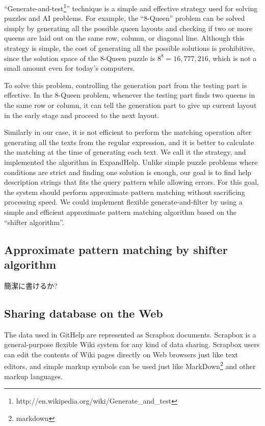 \documentclass{sigchi}
\def\GH{\textsf{GitHelp}}
\def\SB{\textsf{Scrapbox}}
\def\EH{\textsf{ExpandHelp}}
\begin{document}
``Generate-and-test\footnote{
  {\sf http:{\slash}{\slash}en.wikipedia.org{\slash}wiki{\slash}Generate\_and\_test}
}''
technique is a simple and effective strategy
used for solving puzzles and AI problems.
For example,
the ``8-Queen'' problem can be solved simply by
generating all the possible queen layouts and checking if
two or more queens are laid out on the same row, column, or diagonal line.
Although this strategy is simple, the cost of
generating all the possible solutions is prohibitive, since
the solution space of the 8-Queen puzzle is $8^8 = 16,777,216$,
which is not a small amount even for today's computers.

To solve this problem,
controlling the generation part from the testing part is effective.
In the 8-Queen problem,
whenever the testing part finds two queens in the same row or column,
it can tell the generation part to
give up current layout in the early stage and proceed to the next layout.

Similarly in our case,
it is not efficient to perform the matching operation
after generating all the texts from the regular expression,
and it is better to calculate the matching
at the time of generating each text.
We call it the  strategy,
and implemented the algorithm in {\EH}.
Unlike simple puzzle problems where
conditions are strict and finding one solution is enough,
our goal is to find help description strings
that fits the query pattern while allowing errors.
For this goal,
the system should perform approximate pattern matching
without sacrificing processing speed.
%
We could implement flexible generate-and-filter by using a simple and efficient
approximate pattern matching algorithm based on the ``shifter algorithm''.

\subsection{Approximate pattern matching by shifter algorithm}

簡潔に書けるか?

\subsection{Sharing database on the Web}

The data used in {\GH} are represented as {\SB} documents.
%
{\SB} is a general-purpose flexible Wiki system for
any kind of data sharing.
{\SB} users can edit the contents of Wiki pages directly
on Web browsers just like text editors, and simple
markup symbols can be used just like MarkDown\footnote{markdown}
and other markup languages.
\end{document}
